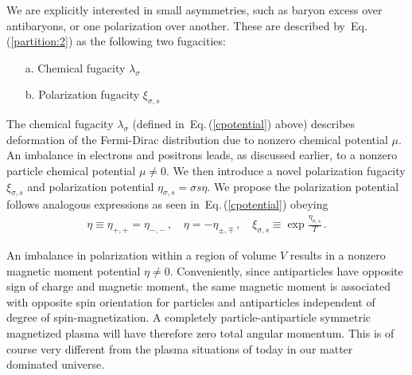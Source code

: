 \documentclass[aps,prd,floatfix,reprint]{revtex4-2}
\newcommand{\req}[1]{Eq.\,(\ref{#1})}
\begin{document}
We are explicitly interested in small asymmetries, such as baryon excess over antibaryons, or one polarization over another. These are described by~\req{partition:2} as the following two fugacities:
\begin{itemize}
 \item[a.] Chemical fugacity $\lambda_{\sigma}$
 \item[b.] Polarization fugacity $\xi_{\sigma,s}$
\end{itemize}
The chemical fugacity $\lambda_{\sigma}$ (defined in~\req{cpotential} above) describes deformation of the Fermi-Dirac distribution due to nonzero chemical potential $\mu$. An imbalance in electrons and positrons leads, as discussed earlier, to a nonzero particle chemical potential $\mu\neq0$. We then introduce a novel polarization fugacity $\xi_{\sigma,s}$ and polarization potential $\eta_{\sigma,s}=\sigma s\eta$. We propose the polarization potential follows analogous expressions as seen in~\req{cpotential} obeying
\begin{align}
 \label{spotential}
 \eta\equiv\eta_{+,+}=\eta_{-,-}\,,\quad\eta=-\eta_{\pm,\mp}\,,\quad\xi_{\sigma,s}\equiv\exp{\frac{\eta_{\sigma,s}}{T}}\,.
\end{align}

An imbalance in polarization within a region of volume $V$ results in a nonzero magnetic moment potential $\eta\neq0$. Conveniently, since antiparticles have opposite sign of charge and magnetic moment, the same magnetic moment is associated with opposite spin orientation for particles and antiparticles independent of degree of spin-magnetization. A completely particle-antiparticle symmetric magnetized plasma will have therefore zero total angular momentum. This is of course very different from the plasma situations of today in our matter dominated universe.

\end{document}
